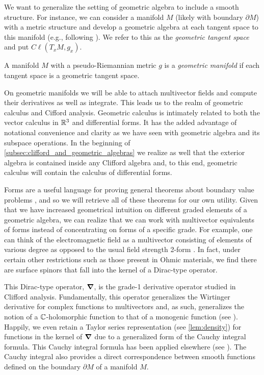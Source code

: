 We want to generalize the setting of geometric algebra to include a smooth structure. For instance, we can consider a manifold $M$ (likely with boundary $\partial M$) with a metric structure and develop a geometric algebra at each tangent space to this manifold (e.g., following \cite{schindler_geometric_2020}). We refer to this as the \emph{geometric tangent space} and put $C\ell(T_xM,g_x)$.
\begin{definition}
A manifold $M$ with a pseudo-Riemannian metric $g$ is a \emph{geometric manifold} if each tangent space is a geometric tangent space.
\end{definition}
On geometric manifolds we will be able to attach multivector fields and compute their derivatives as well as integrate. This leads us to the realm of geometric calculus and Cifford analysis. Geometric calculus is intimately related to both the vector calculus in $\mathbb{R}^3$ and differential forms. It has the added advantage of notational convenience and clarity as we have seen with geometric algebra and its subspace operations. In the beginning of \cref{subsec:clifford_and_geometric_algebras} we realize as well that the exterior algebra is contained inside any Clifford algebra and, to this end, geometric calculus will contain the calculus of differential forms. 

Forms are a useful language for proving general theorems about boundary value problems \cite{schwarz_hodge_1995}, and so we will retrieve all of these theorems for our own utility. Given that we have increased geometrical intuition on different graded elements of a geometric algebra, we can realize that we can work with multivector equivalents of forms instead of concentrating on forms of a specific grade. For example, one can think of the electromagnetic field as a multivector consisting of elements of various degree as opposed to the usual field strength 2-form \cite{warnick_dierential_2014}. In fact, under certain other restrictions such as those present in Ohmic materials, we find there are surface spinors that fall into the kernel of a Dirac-type operator.

This Dirac-type operator, $\boldsymbol{\nabla}$, is the grade-1 derivative operator studied in Clifford analysis. Fundamentally, this operator generalizes the Wirtinger derivative for complex functions to multivectors and, as such, generalizes the notion of a $\mathbb{C}$-holomorphic function to that of a monogenic function (see ). Happily, we even retain a Taylor series representation (see \cref{lem:density}) for functions in the kernel of $\boldsymbol{\nabla}$ due to a generalized form of the Cauchy integral formula. This Cauchy integral formula has been applied elsewhere (see \cite{brackx_hilbert_2008}). The Cauchy integral also provides a direct correspondence between smooth functions defined on the boundary $\partial M$ of a manifold $M$. 

